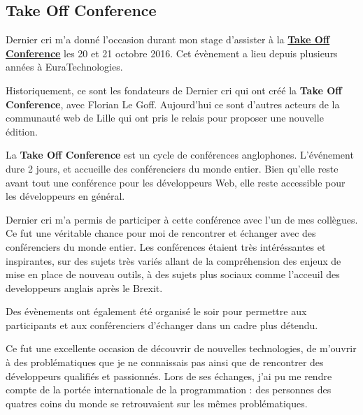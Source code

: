 \documentclass[12pt,a4paper]{article}
\begin{document}
  \subsection{Take Off Conference}\label{take-off-conference}

  \bigskip

  Dernier cri m'a donné l'occasion durant mon stage d'assister à la
  \href{http://takeoffconf.com/2016}{\textbf{Take Off Conference}} les 20
  et 21 octobre 2016. Cet évènement a lieu depuis plusieurs années à
  EuraTechnologies.

  \bigskip

  Historiquement, ce sont les fondateurs de Dernier cri qui ont créé la
  \textbf{Take Off Conference}, avec Florian Le Goff. Aujourd'hui ce sont
  d'autres acteurs de la communauté web de Lille qui ont pris le relais
  pour proposer une nouvelle édition.

  \bigskip

  La \textbf{Take Off Conference} est un cycle de conférences anglophones.
  L'événement dure 2 jours, et accueille des conférenciers du monde
  entier. Bien qu'elle reste avant tout une conférence pour les
  développeurs Web, elle reste accessible pour les développeurs en
  général.

  \bigskip

  Dernier cri m'a permis de participer à cette conférence avec l'un de mes
  collègues. Ce fut une véritable chance pour moi de rencontrer et
  échanger avec des conférenciers du monde entier. Les conférences étaient
  très intéréssantes et inspirantes, sur des sujets très variés allant de
  la compréhension des enjeux de mise en place de nouveau outils, à des
  sujets plus sociaux comme l'acceuil des developpeurs anglais après le
  Brexit.

  \bigskip

  Des évènements ont également été organisé le soir pour permettre aux
  participants et aux conférenciers d'échanger dans un cadre plus détendu.

  \bigskip

  Ce fut une excellente occasion de découvrir de nouvelles technologies,
  de m'ouvrir à des problématiques que je ne connaissais pas ainsi que de
  rencontrer des développeurs qualifiés et passionnés. Lors de ses
  échanges, j'ai pu me rendre compte de la portée internationale de la
  programmation : des personnes des quatres coins du monde se retrouvaient
  sur les mêmes problématiques.

  \bigskip
\end{document}
